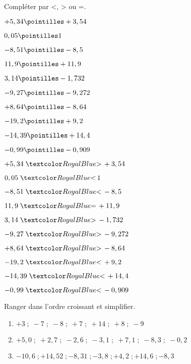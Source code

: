 \begin{Maquette}[Fiche,CorrigeFin,Colonnes=2]{}
\begin{multicols}{2}
      
      \begin{exercice}[SLF] %
         Compléter par <, > ou =.
         {\baselineskip=7mm
         \begin{colenumerate}
            \item $+5,34 \pointilles +3,54$
            \item $0,05 \pointilles 1$
            \item $-8,51 \pointilles -8,5$
            \item $11,9 \pointilles +11,9$
            \item $3,14 \pointilles -1,732$
            \item $-9,27 \pointilles -9,272$
            \item $+8,64 \pointilles -8,64$
            \item $-19,2 \pointilles +9,2$
            \item $-14,39 \pointilles +14,4$
            \item $-0,99 \pointilles -0,909$
         \end{colenumerate}}
      \end{exercice}

      \begin{Solution}
         {\baselineskip=7mm
         \begin{colenumerate}
            \item $+5,34 \; \cor{>} \, +3,54$
            \item $0,05 \; \cor{<} \, 1$
            \item $-8,51 \; \cor{<} \, -8,5$
            \item $11,9 \; \cor{=} \, +11,9$
            \item $3,14 \; \cor{>} \, -1,732$
            \item $-9,27 \; \cor{>} \, -9,272$
            \item $+8,64 \; \cor{>} \, -8,64$
            \item $-19,2 \; \cor{<} \, +9,2$
            \item $-14,39 \; \cor{<} \, +14,4$
            \item $-0,99 \; \cor{<} \, -0,909$
         \end{colenumerate}}
      \end{Solution}
      

      \begin{exercice} %
         Ranger dans l'ordre croissant et simplifier.
         {\baselineskip=7mm
         \begin{enumerate}
            \item $+3 \; ; \; -7 \;;\;-8 \;;\; +7 \;; \;+14\; ;\; +8 \;;\; -9$
            \item $+5,0\; ; \;+2,7 \;;\; -2,6\; ; \;-3,1\; ; \;+7,1\; ; \;-8,3\; ;\; -0,2$
            \item $-10,6 \; ; +14,52\; ; -8,31 \;; -3,8 \;; +4,2 \;; +14,6\; ; -8,3$
         \end{enumerate}}  
      \end{exercice}


\end{multicols}
\end{Maquette}
